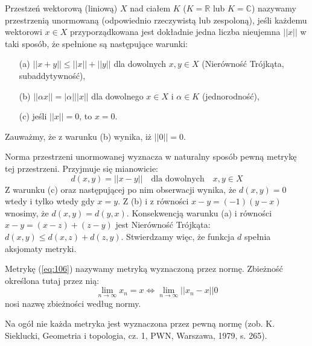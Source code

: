 \documentclass[leqno]{article}
\begin{document}
\begin{justify}
\begin{defn}
    Przestzeń wektorową (liniową) $X$ nad ciałem $K$ ($K = \mathbb{R}$ lub $K = \mathbb{C}$)
    nazywamy przestrzenią unormowaną (odpowiednio rzeczywistą lub zespoloną), jeśli 
    każdemu wektorowi $x \in X$ przyporządkowana jest dokładnie jedna liczba nieujemna $||x||$ w taki sposób, że spełnione są następujące warunki:
    \begin{itemize}
        \item [(a)]
            $||x + y|| \leqslant ||x|| + ||y||$ dla dowolnych $x, y \in X$ (Nierówność Trójkąta, subaddytywność),
        \item [(b)]
            $||\alpha x|| = |\alpha| ||x||$ dla dowolnego $x \in X$ i $\alpha \in K$ (jednorodność),
        \item [(c)]
            jeśli $||x|| = 0$, to $x = 0$.
    \end{itemize}

    Zauważmy, że z warunku (b) wynika, iż $||0|| = 0$.
\end{defn}

\begin{uwaga}
    Norma przestrzeni unormowanej wyznacza w naturalny sposób pewną metrykę tej przestrzeni. Przyjmuje się mianowicie:
    \begin{equation}\label{eq:106}
        d(x, y) = ||x - y|| \quad \text{dla dowolnych} \quad x, y \in X
    \end{equation}
    Z warunku (c) oraz następującej po nim obserwacji wynika, że $d(x, y) = 0$ wtedy i tylko wtedy gdy $x = y$. 
    Z (b) i z równości $x - y = (-1)(y-x)$ wnosimy, że $d(x, y) = d(y, x)$. Konsekwencją warunku (a) i równości 
    $x - y = (x - z) + (z - y)$ jest Nierówność Trójkąta: $d(x, y) \leqslant d(x, z) + d(z, y)$.
    Stwierdzamy więc, że funkcja $d$ spełnia aksjomaty metryki.
\end{uwaga}

\begin{defn}
    Metrykę (\ref{eq:106}) nazywamy metryką wyznaczoną przez normę. Zbieżność określona tutaj przez nią:
    \[
        \lim_{n \to \infty}x_n = x \iff \lim_{n \to \infty}||x_n - x|| 0
    \]
    nosi nazwę zbieżności według normy.
\end{defn}

\begin{uwaga}
    Na ogół nie każda metryka jest wyznaczona przez pewną normę (zob. K. Sieklucki, Geometria i topologia, cz. 1, PWN, 
    Warszawa, 1979, s. 265).
\end{uwaga}


\end{justify}
\end{document}

